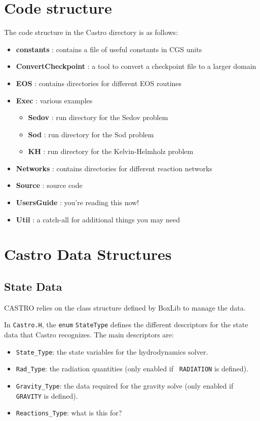 \section{Code structure}

The code structure in the Castro directory is as follows:

\begin{itemize}
    \item {\bf constants}      : contains a file of useful constants in CGS units
    \item {\bf ConvertCheckpoint} : a tool to convert a checkpoint file to a larger domain
    \item {\bf EOS}            : contains directories for different EOS routines
    \item {\bf Exec}       : various examples
    \begin{itemize}
      \item {\bf Sedov}        : run directory for the Sedov problem
      \item {\bf Sod}          : run directory for the Sod problem
      \item {\bf KH}           : run directory for the Kelvin-Helmholz problem
    \end{itemize}
    \item {\bf Networks}       : contains directories for different reaction networks
    \item {\bf Source}     : source code
    \item {\bf UsersGuide} : you're reading this now!
    \item {\bf Util}       : a catch-all for additional things you may need 
\end{itemize}

\section{Castro Data Structures}

\subsection{State Data}

CASTRO relies on the class structure defined by BoxLib to manage the data.  

In {\tt Castro.H}, the {\tt enum} {\tt StateType} defines the
different descriptors for the state data that Castro recognizes.  The
main descriptors are:
\begin{itemize}
\item {\tt State\_Type}: the state variables for the hydrodynamics solver.
\item {\tt Rad\_Type}: the radiation quantities (only enabled if {\tt
  RADIATION} is defined).
\item {\tt Gravity\_Type}: the data required for the gravity solve (only
  enabled if {\tt GRAVITY} is defined).
\item {\tt Reactions\_Type}: {\color{red} what is this for?}
\end{itemize}

